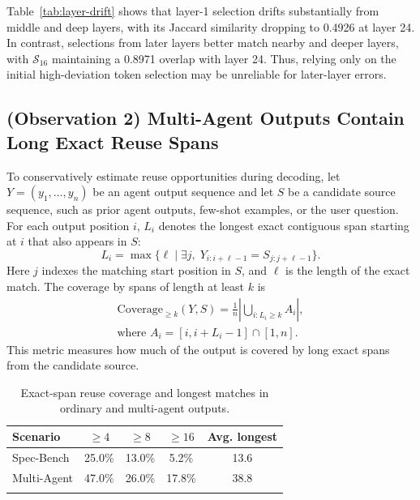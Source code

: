 \documentclass[letterpaper]{article} %
\begin{document}
Table~\ref{tab:layer-drift} shows that layer-1 selection drifts substantially from middle and deep layers, with its Jaccard similarity dropping to 0.4926 at layer 24. In contrast, selections from later layers better match nearby and deeper layers, with $\mathcal S_{16}$ maintaining a 0.8971 overlap with layer 24. Thus, relying only on the initial high-deviation token selection may be unreliable for later-layer errors.

\subsection{(Observation 2) Multi-Agent Outputs Contain Long Exact Reuse Spans}

To conservatively estimate reuse opportunities during decoding, let $Y=(y_1,\ldots,y_n)$ be an agent output sequence and let $S$ be a candidate source sequence, such as prior agent outputs, few-shot examples, or the user question. For each output position $i$, $L_i$ denotes the longest exact contiguous span starting at $i$ that also appears in $S$:
\begin{equation}
L_i=\max\{\ell \mid \exists j,\;Y_{i:i+\ell-1}=S_{j:j+\ell-1}\}.
\end{equation}
Here $j$ indexes the matching start position in $S$, and $\ell$ is the length of the exact match.
The coverage by spans of length at least $k$ is
\begin{equation}
\begin{gathered}
\mathrm{Coverage}_{\ge k}(Y,S)
=\frac{1}{n}\left|\bigcup_{i:L_i\ge k} A_i\right|,\\
\text{where } A_i=[i,i+L_i-1]\cap[1,n].
\end{gathered}
\end{equation}
This metric measures how much of the output is covered by long exact spans from the candidate source.

\begin{table}[t]
\centering
\begin{tabular}{lcccc}
\hline
\addlinespace[1pt]
Scenario & $\ge4$ & $\ge8$ & $\ge16$ & Avg. longest \\
\hline
\addlinespace[1pt]
Spec-Bench & 25.0\% & 13.0\% & 5.2\% & 13.6 \\
\addlinespace[1pt]
Multi-Agent & 47.0\% & 26.0\% & 17.8\% & 38.8 \\
\addlinespace[1pt]
\hline
\end{tabular}
\caption{Exact-span reuse coverage and longest matches in ordinary and multi-agent outputs.}
\label{tab:coverage}
\end{table}
\end{document}
